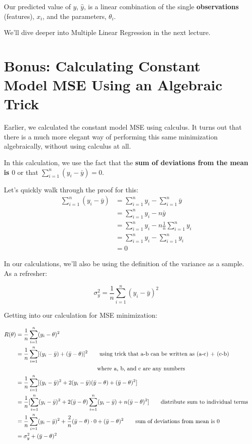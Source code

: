 \documentclass[
  letterpaper,
  DIV=11,
  numbers=noendperiod]{scrreprt}
\begin{document}
Our predicted value of \(y\), \(\hat{y}\), is a linear combination of
the single \textbf{observations} (features), \(x_i\), and the
parameters, \(\theta_i\).

We'll dive deeper into Multiple Linear Regression in the next lecture.

\section{Bonus: Calculating Constant Model MSE Using an Algebraic
Trick}\label{bonus-calculating-constant-model-mse-using-an-algebraic-trick}

Earlier, we calculated the constant model MSE using calculus. It turns
out that there is a much more elegant way of performing this same
minimization algebraically, without using calculus at all.

In this calculation, we use the fact that the \textbf{sum of deviations
from the mean is \(0\)} or that \(\sum_{i=1}^{n} (y_i - \bar{y}) = 0\).

Let's quickly walk through the proof for this: \[
\begin{align}
\sum_{i=1}^{n} (y_i - \bar{y}) &= \sum_{i=1}^{n} y_i - \sum_{i=1}^{n} \bar{y} \\
 &= \sum_{i=1}^{n} y_i - n\bar{y} \\
 &= \sum_{i=1}^{n} y_i - n\frac{1}{n}\sum_{i=1}^{n}y_i \\
 &= \sum_{i=1}^{n} y_i - \sum_{i=1}^{n}y_i \\
 & = 0
\end{align}
\]

In our calculations, we'll also be using the definition of the variance
as a sample. As a refresher:

\[\sigma_y^2 = \frac{1}{n}\sum_{i=1}^{n} (y_i - \bar{y})^2\]

Getting into our calculation for MSE minimization:

\[
\begin{align}
R(\theta) &= {\frac{1}{n}}\sum^{n}_{i=1} (y_i - \theta)^2
\\ &= \frac{1}{n}\sum^{n}_{i=1} [(y_i - \bar{y}) + (\bar{y} - \theta)]^2\quad \quad \text{using trick that a-b can be written as (a-c) + (c-b) } \\
&\quad \quad \quad \quad \quad \quad \quad \quad \quad \quad \quad \quad \quad \quad \space \space \text{where a, b, and c are any numbers}
\\ &= \frac{1}{n}\sum^{n}_{i=1} [(y_i - \bar{y})^2 + 2(y_i - \bar{y})(\bar{y} - \theta) + (\bar{y} - \theta)^2]
\\ &= \frac{1}{n}[\sum^{n}_{i=1}(y_i - \bar{y})^2 + 2(\bar{y} - \theta)\sum^{n}_{i=1}(y_i - \bar{y}) + n(\bar{y} - \theta)^2] \quad \quad  \text{distribute sum to individual terms}
\\ &= \frac{1}{n}\sum^{n}_{i=1}(y_i - \bar{y})^2 + \frac{2}{n}(\bar{y} - \theta)\cdot0 + (\bar{y} - \theta)^2 \quad \quad  \text{sum of deviations from mean is 0}
\\ &= \sigma_y^2 + (\bar{y} - \theta)^2
\end{align}
\]
\end{document}
